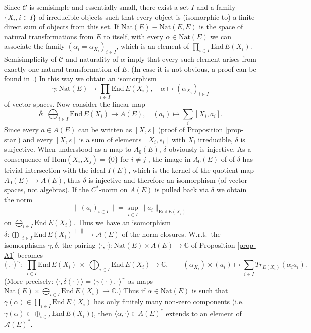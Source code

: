 \documentclass[11pt]{article}
\theoremstyle{definition}
\theoremstyle{definition}
\theoremstyle{remark}
\def\2#1{{\mathcal #1}}
\def\7#1{{\mathbb #1}}
\def\ol#1{{\overline #1}}
\newcommand{\Hom}{\mathrm{Hom}}
\newcommand{\End}{\mathrm{End}}
\newcommand{\rarr}{\rightarrow}
\newcommand{\Nat}{\mathrm{Nat}}
\begin{document}
Since $\2C$ is semisimple and essentially small, there exist a set $I$ and a family 
$\{X_i, i\in I\}$ of irreducible objects such that every object is (isomorphic to) a finite direct
sum of objects from this set. If $\Nat(E)\equiv\Nat(E,E)$ is the space of natural transformations
from $E$ to itself, with every $\alpha\in\Nat(E)$ we can associate the family
$(\alpha_i=\alpha_{X_i})_{i\in I}$, which is an element of $\prod_{i\in  I}\End\,E(X_i)$. 
Semisimplicity of $\2C$ and naturality of $\alpha$ imply that every such element arises from exactly
one natural transformation of $E$. (In case it is not obvious, a proof can be found in
\cite[Proposition 5.4]{MRT}.) In this way we obtain an isomorphism  
\[ \gamma: \Nat(E)\rarr\prod_{i\in I}\End\,E(X_i), \quad \alpha\mapsto(\alpha_{X_i})_{i\in I} \]
of vector spaces. Now consider the linear map
\[ \delta:\ \bigoplus_{i\in I} \End\,E(X_i)\rarr A(E), \quad (a_i)\mapsto \sum_i [X_i,a_i]. \]
Since every $a\in A(E)$ can be written as $[X,s]$ (proof of Proposition \ref{prop-star}) and every
$[X,s]$ is a sum of elements $[X_i,s_i]$ with $X_i$ irreducible,
$\delta$ is surjective. When understood as a map to $A_0(E)$,
$\delta$ obviously is injective. As a consequence of $\Hom(X_i,X_j)=\{0\}$ for $i\ne j$ ,
the image in $A_0(E)$ of of $\delta$ has trivial intersection with the ideal $I(E)$, which
is the kernel of the quotient map $A_0(E)\rarr A(E)$, thus $\delta$ is injective and
therefore an isomorphism (of vector spaces, not algebras). 
If the $C^*$-norm on $A(E)$ is pulled back via $\delta$ we obtain the norm
\[ \| (a_i)_{i\in I} \| = \sup_{i\in I} \|a_i\|_{\End\,E(X_i)} \]
on $\bigoplus_{i\in I} \End\,E(X_i)$. Thus we have an isomorphism 
$\ol{\delta}:\ol{\bigoplus_{i\in I}\End\,E(X_i)}^{\|\cdot\|}\rarr\2A(E)$ of the norm closures.
W.r.t.\ the isomorphisms $\gamma,\delta$,
the pairing $\langle\cdot,\cdot\rangle: \Nat(E)\times A(E)\rarr\7C$ of Proposition \ref{prop-A1}
becomes
\[ \langle\cdot,\cdot\rangle^\sim:\ \prod_{i\in I}\End\,E(X_i) \ \times\ \bigoplus_{i\in I}
   \End\,E(X_i)\rarr\7C, \quad\quad 
   (\alpha_{X_i})\times(a_i)\mapsto \sum_{i\in I} Tr_{E(X_i)}(\alpha_ia_i). \]
(More precisely: $\langle \cdot,\delta(\cdot)\rangle=\langle\gamma(\cdot),\cdot\rangle^\sim$ as maps
$\Nat(E)\times\bigoplus_{i\in I} \End\,E(X_i)\rarr\7C$.)
Thus if $\alpha\in\Nat(E)$ is such that $\gamma(\alpha)\in\prod_{i\in I}\End\,E(X_i)$ has only
finitely many non-zero components (i.e.\ $\gamma(\alpha)\in\oplus_{i\in I}\End\,E(X_i)$), then
$\langle\alpha,\cdot\rangle\in A(E)^*$  extends to an element of $\2A(E)^*$. 
\end{document}
